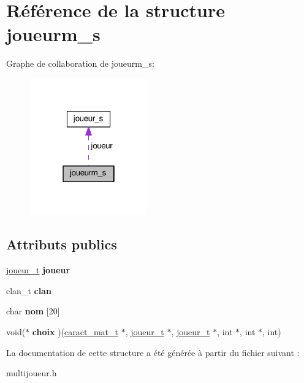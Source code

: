 \hypertarget{structjoueurm__s}{}\section{Référence de la structure joueurm\+\_\+s}
\label{structjoueurm__s}


Graphe de collaboration de joueurm\+\_\+s\+:\nopagebreak
\begin{figure}[H]
\begin{center}
\leavevmode
\includegraphics[width=142pt]{structjoueurm__s__coll__graph}
\end{center}
\end{figure}
\subsection*{Attributs publics}
\begin{DoxyCompactItemize}
\item 
\hyperlink{structjoueur__s}{joueur\+\_\+t} {\bfseries joueur}\hypertarget{structjoueurm__s_adb23e424b4149c57a0a67ec8cf2d9c79}{}\label{structjoueurm__s_adb23e424b4149c57a0a67ec8cf2d9c79}

\item 
clan\+\_\+t {\bfseries clan}\hypertarget{structjoueurm__s_ad121cc6e2377bdc011889472c18bc094}{}\label{structjoueurm__s_ad121cc6e2377bdc011889472c18bc094}

\item 
char {\bfseries nom} \mbox{[}20\mbox{]}\hypertarget{structjoueurm__s_afefb62cb34b9cd50ae51836fcc048e91}{}\label{structjoueurm__s_afefb62cb34b9cd50ae51836fcc048e91}

\item 
void($\ast$ {\bfseries choix} )(\hyperlink{structcaract__mat__t}{caract\+\_\+mat\+\_\+t} $\ast$, \hyperlink{structjoueur__s}{joueur\+\_\+t} $\ast$, \hyperlink{structjoueur__s}{joueur\+\_\+t} $\ast$, int $\ast$, int $\ast$, int)\hypertarget{structjoueurm__s_ac8bc4a90e2b4ae1809dd47e270bf90af}{}\label{structjoueurm__s_ac8bc4a90e2b4ae1809dd47e270bf90af}

\end{DoxyCompactItemize}


La documentation de cette structure a été générée à partir du fichier suivant \+:\begin{DoxyCompactItemize}
\item 
multijoueur.\+h\end{DoxyCompactItemize}
